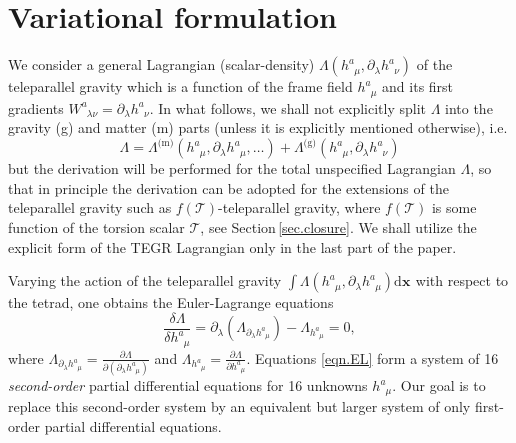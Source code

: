 \documentclass[
10pt, %
a4paper, %
oneside, %
twocolumn,
headinclude,footinclude, %
BCOR5mm, %
]{scrartcl}
\newcommand{\pd}[1]{\partial_{#1}}
\newcommand{\dx}[1]{{\bm{\mathrm{d}x}^{#1}}}
\newcommand{\tetrsymbol}{h}
\newcommand{\tetr}[2]{\tetrsymbol^{#1}_{\phantom{#1}#2}}
\newcommand{\w}[2]{W^{#1}_{\phantom{#1}#2}}
\newcommand{\Lag}{\Lambda}	%
\newcommand{\LCsymb}{\bm{\in}}    %
\newcommand{\LCtens}{\varepsilon} %
\newcommand{\Tscal}{\mathcal{T}}		%
\begin{document}
	
	
	
	
	
	
	\section{Variational formulation}
	
	We consider a general Lagrangian (scalar-density) $ 
	\Lag(\tetr{a}{\mu},\pd{\lambda}\tetr{a}{\nu}) $ 
	of the teleparallel gravity which is a function of the frame field $ \tetr{a}{\mu} $ and its 
	first 
	gradients $ \w{a}{\lambda\nu} = \pd{\lambda}\tetr{a}{\nu} $. In what follows, we shall not 
	explicitly split $ \Lag $ 
	into the gravity (g) and matter (m) parts (unless it is explicitly mentioned otherwise), i.e. 
	\begin{equation}\label{eqn.Lagr.split}
		\Lag = \Lag^\text{(m)}(\tetr{a}{\mu},\pd{\lambda}\tetr{a}{\mu},\ldots) + 
		\Lag^\text{(g)}(\tetr{a}{\mu},\pd{\lambda}\tetr{a}{\nu}) 
	\end{equation}
	but the 
	derivation will be performed for the total unspecified Lagrangian $ \Lag $, so that in 
	principle 
	the derivation 
	can be adopted for the extensions of the teleparallel gravity such as $ f(\Tscal) 
	$-teleparallel 
	gravity, 
	where $ f(\Tscal) $ is some function of the torsion scalar $ \Tscal $, see 
	Section\,\ref{sec.closure}. We shall utilize the explicit form 
	of the TEGR Lagrangian only in the last part of the paper.
	
	Varying the action of the teleparallel gravity $ \int 
	\Lag(\tetr{a}{\mu},\pd{\lambda}\tetr{a}{\mu}) 
	\bm{\dx{}}$ 
	with respect to 
	the tetrad, one obtains the Euler-Lagrange equations 
	\begin{equation}\label{eqn.EL}
		\frac{\delta \Lambda}{\delta\tetr{a}{\mu}} = \pd{\lambda}(\Lag_{\pd{\lambda}\tetr{a}{\mu}}) 
		- 
		\Lag_{\tetr{a}{\mu}} = 0,
	\end{equation}
	where $ \Lag_{\pd{\lambda}\tetr{a}{\mu}} = \frac{\partial 
		\Lag}{\partial(\pd{\lambda}\tetr{a}{\mu})} $ and $ 
	\Lag_{\tetr{a}{\mu}} = \frac{\partial \Lag}{\partial\tetr{a}{\mu}} $. Equations \eqref{eqn.EL} 
	form a system of 16 \emph{second-order} partial differential equations for 
	16 unknowns $ \tetr{a}{\mu} $. Our goal is to replace this second-order system by an equivalent 
	but 
	larger system of only first-order partial differential equations.
	
\end{document}
